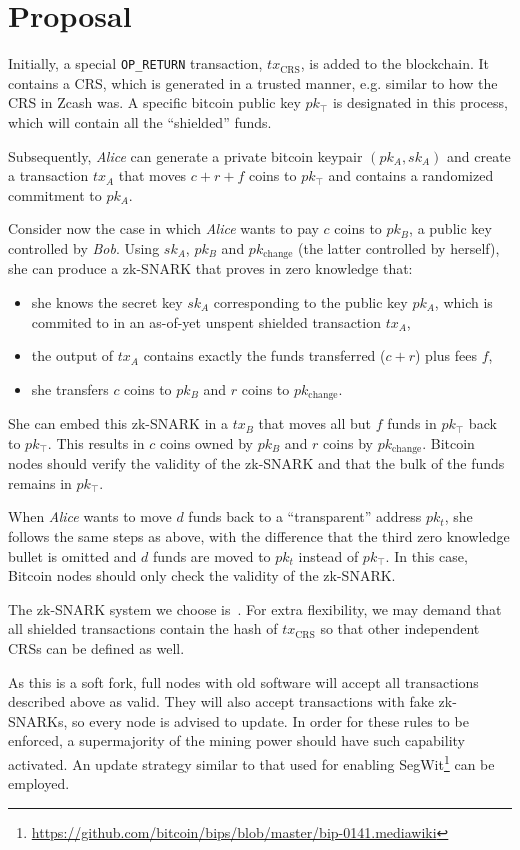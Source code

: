 \section{Proposal}
  Initially, a special \texttt{OP\_RETURN} transaction,
  $\mathit{tx}_{\mathrm{CRS}}$, is added to the blockchain. It contains a CRS,
  which is generated in a trusted manner, e.g.  similar to how the CRS in Zcash
  was. A specific bitcoin public key $pk_{\top}$ is designated in this process,
  which will contain all the ``shielded'' funds.

  Subsequently, \textit{Alice} can generate a private bitcoin keypair $(pk_A,
  sk_A)$ and create a transaction $\textit{tx}_A$ that moves $c + r + f$ coins
  to $pk_{\top}$ and contains a randomized commitment to $pk_A$.

  Consider now the case in which \textit{Alice} wants to pay $c$ coins to
  $pk_B$, a public key controlled by \textit{Bob}. Using $sk_A$, $pk_B$ and
  $pk_{\textrm{change}}$ (the latter controlled by herself), she can produce a
  zk-SNARK that proves in zero knowledge that:
  \begin{itemize}
    \item she knows the secret key $sk_A$ corresponding to the public key
    $pk_A$, which is commited to in an as-of-yet unspent shielded transaction
    $\textit{tx}_A$,
    \item the output of $\textit{tx}_A$ contains exactly the funds transferred
    ($c + r$) plus fees $f$,
    \item she transfers $c$ coins to $pk_B$ and $r$ coins to
    $pk_{\mathrm{change}}$.
  \end{itemize}
  She can embed this zk-SNARK in a $\textit{tx}_B$ that moves all but $f$ funds in
  $pk_{\top}$ back to $pk_{\top}$. This results in $c$ coins owned by $pk_B$ and
  $r$ coins by $pk_{\mathrm{change}}$. Bitcoin nodes should verify the validity
  of the zk-SNARK and that the bulk of the funds remains in $pk_{\top}$.

  When \textit{Alice} wants to move $d$ funds back to a ``transparent''
  address $pk_t$, she follows the same steps as above, with the difference that
  the third zero knowledge bullet is omitted and $d$ funds are moved to $pk_t$
  instead of $pk_{\top}$. In this case, Bitcoin nodes should only check the
  validity of the zk-SNARK.

  The zk-SNARK system we choose is~\cite{DBLP:conf/eurocrypt/Groth16}.  For
  extra flexibility, we may demand that all shielded transactions contain the
  hash of $\mathit{tx}_{\mathrm{CRS}}$ so that other independent CRSs can be
  defined as well.

  As this is a soft fork, full nodes with old software will accept all
  transactions described above as valid. They will also accept transactions with
  fake zk-SNARKs, so every node is advised to update. In order for these rules to
  be enforced, a supermajority of the mining power should have such capability
  activated. An update strategy similar to that used for enabling
  SegWit\footnote{\url{https://github.com/bitcoin/bips/blob/master/bip-0141.mediawiki}} can be employed.
